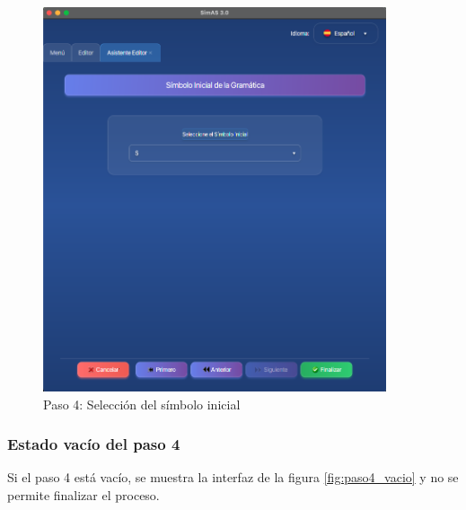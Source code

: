 \needspace{8cm}
\begin{figure}[H]
    \centering
    \includegraphics[width=0.9\textwidth]{figuras/editor/paso4_inicial.png}
    \caption{Paso 4: Selección del símbolo inicial}
    \label{fig:paso4_inicial}
\end{figure}

\subsubsection{Estado vacío del paso 4}

Si el paso 4 está vacío, se muestra la interfaz de la figura \ref{fig:paso4_vacio} y no se permite finalizar el proceso.


